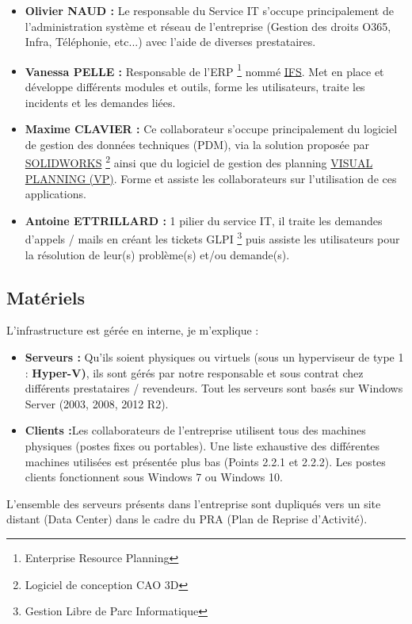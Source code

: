 \documentclass[11pt,a4paper,oneside]{article}
\begin{document}
\begin{itemize}
    \item \textbf{Olivier NAUD :} Le responsable du Service IT s'occupe principalement de l'administration système et réseau de l'entreprise (Gestion des droits O365, Infra, Téléphonie, etc...) avec l'aide de diverses prestataires. \\
    \item \textbf{Vanessa PELLE :} Responsable de l'ERP \footnote{Enterprise Resource Planning} nommé \hyperlink{https://www.ifsworld.com/fr/}{IFS}. Met en place et développe  différents modules et outils, forme les utilisateurs, traite les incidents et les demandes liées. \\
    \item \textbf{Maxime CLAVIER :} Ce collaborateur s’occupe principalement du logiciel de gestion des données techniques (PDM), via la solution proposée par \hyperlink{https://www.solidworks.com/fr}{SOLIDWORKS} \footnote{Logiciel de conception CAO 3D} ainsi que du logiciel de gestion des planning \hyperlink{https://www.visual-planning.com/fr/}{VISUAL PLANNING  (VP)}. Forme et assiste les collaborateurs sur l’utilisation de ces applications.\\
    \item \textbf{Antoine ETTRILLARD :} 1\ier{} pilier du service IT, il traite les demandes d'appels / mails en créant les tickets GLPI \footnote{Gestion Libre de Parc Informatique} puis assiste les utilisateurs pour la résolution de leur(s) problème(s) et/ou demande(s).
\end{itemize}
   
\subsection{Matériels}
L'infrastructure est gérée en interne, je m'explique :

\begin{itemize}
    \item \textbf{Serveurs :} Qu'ils soient physiques ou virtuels (sous un hyperviseur de type 1 : \textbf{Hyper-V)}, ils sont gérés par notre responsable et sous contrat chez différents prestataires / revendeurs. Tout les serveurs sont basés sur Windows Server (2003, 2008, 2012 R2).\\
    \item \textbf{Clients :}Les collaborateurs de l’entreprise utilisent tous des machines physiques (postes fixes ou portables). Une liste exhaustive des différentes machines utilisées est présentée plus bas (Points 2.2.1 et 2.2.2). Les postes clients fonctionnent sous Windows 7 ou Windows 10. \\
\end{itemize}
L’ensemble des serveurs présents dans l’entreprise sont dupliqués vers un site distant (Data Center) dans le cadre du PRA (Plan de Reprise d’Activité).
\end{document}
